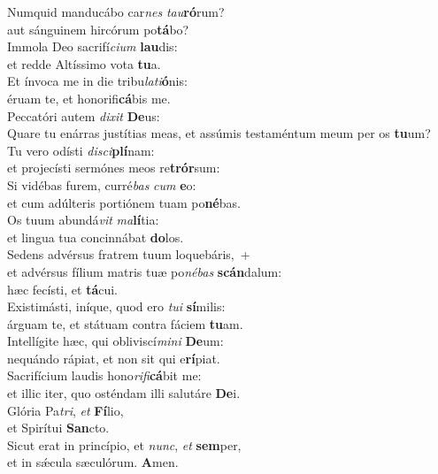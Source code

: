\evenverse Numquid manducábo car\textit{nes} \textit{tau}\textbf{ró}rum?~\*\\
\evenverse aut sánguinem hircórum po\textbf{tá}bo?\\
\oddverse Immola Deo sacrifí\textit{ci}\textit{um} \textbf{lau}dis:~\*\\
\oddverse et redde Altíssimo vota \textbf{tu}a.\\
\evenverse Et ínvoca me in die tribu\textit{la}\textit{ti}\textbf{ó}nis:~\*\\
\evenverse éruam te, et honorifi\textbf{cá}bis me.\\
\oddverse Peccatóri autem \textit{di}\textit{xit} \textbf{De}us:~\*\\
\oddverse Quare tu enárras justítias meas, et assúmis testaméntum meum per os \textbf{tu}um?\\
\evenverse Tu vero odísti \textit{di}\textit{sci}\textbf{plí}nam:~\*\\
\evenverse et projecísti sermónes meos re\textbf{trór}sum:\\
\oddverse Si vidébas furem, curré\textit{bas} \textit{cum} \textbf{e}o:~\*\\
\oddverse et cum adúlteris portiónem tuam po\textbf{né}bas.\\
\evenverse Os tuum abundá\textit{vit} \textit{ma}\textbf{lí}tia:~\*\\
\evenverse et lingua tua concinnábat \textbf{do}los.\\
\oddverse Sedens advérsus fratrem tuum loquebáris,~+\\
\oddverse  et advérsus fílium matris tuæ po\textit{né}\textit{bas} \textbf{scán}dalum:~\*\\
\oddverse hæc fecísti, et \textbf{tá}cui.\\
\evenverse Existimásti, iníque, quod ero \textit{tu}\textit{i} \textbf{sí}milis:~\*\\
\evenverse árguam te, et státuam contra fáciem \textbf{tu}am.\\
\oddverse Intellígite hæc, qui obliviscí\textit{mi}\textit{ni} \textbf{De}um:~\*\\
\oddverse nequándo rápiat, et non sit qui e\textbf{rí}piat.\\
\evenverse Sacrifícium laudis hono\textit{ri}\textit{fi}\textbf{cá}bit me:~\*\\
\evenverse et illic iter, quo osténdam illi salutáre \textbf{De}i.\\
\oddverse Glória Pa\textit{tri}, \textit{et} \textbf{Fí}lio,~\*\\
\oddverse et Spirítui \textbf{San}cto.\\
\evenverse Sicut erat in princípio, et \textit{nunc}, \textit{et} \textbf{sem}per,~\*\\
\evenverse et in sǽcula sæculórum. \textbf{A}men.\\
